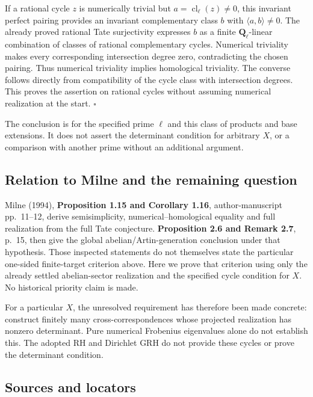 \documentclass[11pt,a4paper]{article}
\theoremstyle{definition}\newtheorem{definition}[theorem]{Definition}
\theoremstyle{remark}\newtheorem{remark}[theorem]{Remark}
\begin{document}
If a rational cycle \(z\) is numerically trivial but
\(a=\operatorname{cl}_\ell(z)\ne0\), this invariant perfect pairing
provides an invariant complementary class \(b\) with
\(\langle a,b\rangle\ne0\). The already proved rational Tate
surjectivity expresses \(b\) as a finite \(\mathbf Q_\ell\)-linear
combination of classes of rational complementary cycles. Numerical
triviality makes every corresponding intersection degree zero,
contradicting the chosen pairing. Thus numerical triviality implies
homological triviality. The converse follows directly from compatibility
of the cycle class with intersection degrees. This proves the assertion
on rational cycles without assuming numerical realization at the start.
\(\square\)

The conclusion is for the specified prime \(\ell\) and this class of
products and base extensions. It does not assert the determinant
condition for arbitrary \(X\), or a comparison with another prime
without an additional argument.

\subsection{Relation to Milne and the remaining
question}\label{relation-to-milne-and-the-remaining-question}

Milne (1994), \textbf{Proposition 1.15 and Corollary 1.16},
author-manuscript pp.~11--12, derive semisimplicity,
numerical--homological equality and full realization from the full Tate
conjecture. \textbf{Proposition 2.6 and Remark 2.7}, p.~15, then give
the global abelian/Artin-generation conclusion under that hypothesis.
Those inspected statements do not themselves state the particular
one-sided finite-target criterion above. Here we prove that criterion
using only the already settled abelian-sector realization and the
specified cycle condition for \(X\). No historical priority claim is
made.

For a particular \(X\), the unresolved requirement has therefore been
made concrete: construct finitely many cross-correspondences whose
projected realization has nonzero determinant. Pure numerical Frobenius
eigenvalues alone do not establish this. The adopted RH and Dirichlet
GRH do not provide these cycles or prove the determinant condition.

\subsection{Sources and locators}\label{sources-and-locators}
\end{document}
